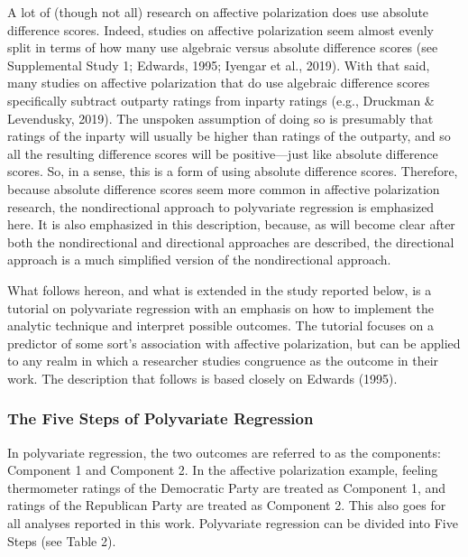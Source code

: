 \documentclass[authordate, meta, issue]{jote-new-article}
\begin{document}
	A lot of (though not all) research on affective polarization does use absolute difference scores. Indeed, studies on affective polarization seem almost evenly split in terms of how many use algebraic versus absolute difference scores (see Supplemental Study 1; Edwards, 1995; Iyengar et al., 2019). With that said, many studies on affective polarization that do use algebraic difference scores specifically subtract outparty ratings from inparty ratings (e.g., Druckman \& Levendusky, 2019). The unspoken assumption of doing so is presumably that ratings of the inparty will usually be higher than ratings of the outparty, and so all the resulting difference scores will be positive—just like absolute difference scores. So, in a sense, this is a form of using absolute difference scores. Therefore, because absolute difference scores seem more common in affective polarization research, the nondirectional approach to polyvariate regression is emphasized here. It is also emphasized in this description, because, as will become clear after both the nondirectional and directional approaches are described, the directional approach is a much simplified version of the nondirectional approach.



	What follows hereon, and what is extended in the study reported below, is a tutorial on polyvariate regression with an emphasis on how to implement the analytic technique and interpret possible outcomes. The tutorial focuses on a predictor of some sort's association with affective polarization, but can be applied to any realm in which a researcher studies congruence as the outcome in their work. The description that follows is based closely on Edwards (1995).



	\subsubsection{The Five Steps of Polyvariate Regression}



	In polyvariate regression, the two outcomes are referred to as the components: Component 1 and Component 2. In the affective polarization example, feeling thermometer ratings of the Democratic Party are treated as Component 1, and ratings of the Republican Party are treated as Component 2. This also goes for all analyses reported in this work. Polyvariate regression can be divided into Five Steps (see Table 2).
\end{document}
